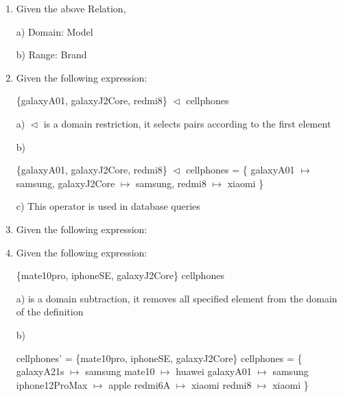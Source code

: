 \documentclass[12pt]{article}
\begin{document}
\begin{enumerate}
	\item Given the above Relation,

	\indent a) Domain: Model
	
	\indent b) Range: Brand
	
	\item Given the following expression:
	
	\indent	\{galaxyA01, galaxyJ2Core, redmi8\} $\vartriangleleft$ cellphones
	
	\indent a) $\vartriangleleft$ is a domain restriction, it selects pairs according to the first element
	
	\indent b) 

	\indent \{galaxyA01, galaxyJ2Core, redmi8\} $\vartriangleleft$ cellphones = \{
	\newline	 galaxyA01 $\mapsto$ samsung,
	\newline	 galaxyJ2Core $\mapsto$ samsung,
	\newline	 redmi8 $\mapsto$ xiaomi	
	\newline \}
	
	\indent c) This operator is used in database queries

	\item Given the following expression:
	
	\item Given the following expression:
	
	\indent \{mate10pro, iphoneSE, galaxyJ2Core\} \ooalign{$\vartriangleleft$\cr\hidewidth\scalebox{1}[1]{$-$}\hidewidth\cr} cellphones

	\indent a) \ooalign{$\vartriangleleft$\cr\hidewidth\scalebox{1}[1]{$-$}\hidewidth\cr} is a domain subtraction, it removes all specified element from the domain of the definition

	\indent b)

	\indent cellphones' = \{mate10pro, iphoneSE, galaxyJ2Core\} \ooalign{$\vartriangleleft$\cr\hidewidth\scalebox{1}[1]{$-$}\hidewidth\cr} cellphones = \{
	\newline	galaxyA21s $\mapsto$ samsung
	\newline	mate10 $\mapsto$ huawei
	\newline	galaxyA01 $\mapsto$ samsung
	\newline	iphone12ProMax $\mapsto$ apple
	\newline	redmi6A $\mapsto$ xiaomi
	\newline	redmi8 $\mapsto$ xiaomi
	\newline \}


\end{enumerate}
\end{document}
